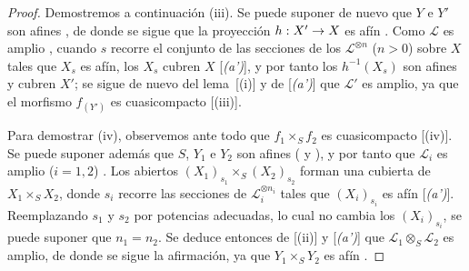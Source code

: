 \documentclass[oneside,10pt]{amsart}
\makeatletter
\newcommand{\ega@arrow}[2]{\mathchoice{#1}{#2}{#2}{#2}}
\renewcommand{\to}{\ega@arrow{\longrightarrow}{\rightarrow}}
\makeatother
\begin{document}
\begin{proof}
Demostremos a continuación (iii).
Se puede suponer de nuevo que $Y$ e $Y'$ son afines , de donde se sigue que la proyección $h:X'\to X$ es afín .
Como $\mathcal{L}$ es amplio , cuando $s$ recorre el conjunto de las secciones de los $\mathcal{L}^{\otimes n}$ ($n>0$) sobre $X$ tales que $X_s$ es afín, los $X_s$ cubren $X$ [\emph{(a')}], y por tanto los $h^{-1}(X_s)$ son afines  y cubren $X'$;
se sigue de nuevo del lema~[(i)] y de [\emph{(a')}] que $\mathcal{L}'$ es amplio, ya que el morfismo $f_{(Y')}$ es cuasicompacto [(iii)].

Para demostrar (iv), observemos ante todo que $f_1\times_S f_2$ es cuasicompacto [(iv)].
Se puede suponer además que $S$, $Y_1$ e $Y_2$ son afines ( y ), y por tanto que $\mathcal{L}_i$ es amplio ($i=1,2$) .
Los abiertos $(X_1)_{s_1}\times_S(X_2)_{s_2}$ forman una cubierta de $X_1\times_S X_2$, donde $s_i$ recorre las secciones de $\mathcal{L}_i^{\otimes n_i}$ tales que $(X_i)_{s_i}$ es afín [\emph{(a')}].
Reemplazando $s_1$ y $s_2$ por potencias adecuadas, lo cual no cambia los $(X_i)_{s_i}$, se puede suponer que $n_1=n_2$.
Se deduce entonces de [(ii)] y [\emph{(a')}] que $\mathcal{L}_1\otimes_S\mathcal{L}_2$ es amplio, de donde se sigue la afirmación, ya que $Y_1\times_S Y_2$ es afín .


\end{proof}
\end{document}

